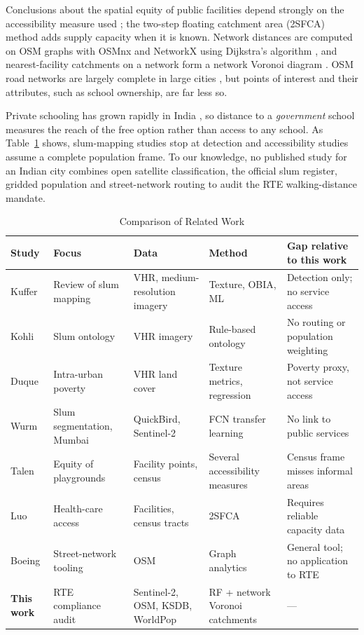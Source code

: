 \documentclass[conference]{IEEEtran}
\begin{document}
Conclusions about the spatial equity of public facilities depend strongly on the accessibility measure used \cite{talen1998}; the two-step floating catchment area (2SFCA) method \cite{luo2003,radke2000} adds supply capacity when it is known. Network distances are computed on OSM graphs with OSMnx \cite{boeing2017} and NetworkX \cite{hagberg2008} using Dijkstra's algorithm \cite{dijkstra1959}, and nearest-facility catchments on a network form a network Voronoi diagram \cite{erwig2000,okabe2008}. OSM road networks are largely complete in large cities \cite{haklay2010,barrington2017}, but points of interest and their attributes, such as school ownership, are far less so.

Private schooling has grown rapidly in India \cite{kingdon2020,muralidharan2015}, so distance to a \emph{government} school measures the reach of the free option rather than access to any school. As Table~\ref{tab:lit} shows, slum-mapping studies stop at detection and accessibility studies assume a complete population frame. To our knowledge, no published study for an Indian city combines open satellite classification, the official slum register, gridded population and street-network routing to audit the RTE walking-distance mandate.

\begin{table}[!t]
\centering
\caption{Comparison of Related Work}
\label{tab:lit}
\footnotesize
\begin{tabularx}{\textwidth}{@{}p{1.6cm}p{3.0cm}p{3.1cm}p{3.1cm}X@{}}
\toprule
\textbf{Study} & \textbf{Focus} & \textbf{Data} & \textbf{Method} & \textbf{Gap relative to this work} \\
\midrule
Kuffer \cite{kuffer2016} & Review of slum mapping & VHR, medium-resolution imagery & Texture, OBIA, ML & Detection only; no service access \\
Kohli \cite{kohli2012} & Slum ontology & VHR imagery & Rule-based ontology & No routing or population weighting \\
Duque \cite{duque2015} & Intra-urban poverty & VHR land cover & Texture metrics, regression & Poverty proxy, not service access \\
Wurm \cite{wurm2019} & Slum segmentation, Mumbai & QuickBird, Sentinel-2 & FCN transfer learning & No link to public services \\
Talen \cite{talen1998} & Equity of playgrounds & Facility points, census & Several accessibility measures & Census frame misses informal areas \\
Luo \cite{luo2003} & Health-care access & Facilities, census tracts & 2SFCA & Requires reliable capacity data \\
Boeing \cite{boeing2017} & Street-network tooling & OSM & Graph analytics & General tool; no application to RTE \\
\textbf{This work} & RTE compliance audit & Sentinel-2, OSM, KSDB, WorldPop & RF + network Voronoi catchments & --- \\
\bottomrule
\end{tabularx}
\end{table}
\end{document}
